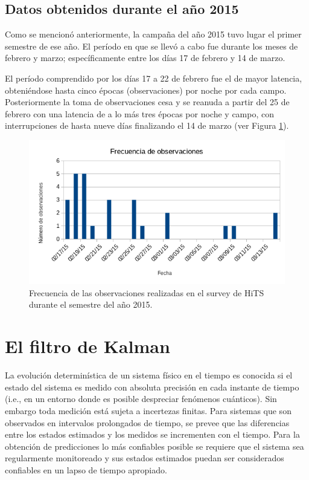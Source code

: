 \subsection{Datos obtenidos durante el a\~no 2015}\label{ssec:data}
Como se mencion\'o anteriormente, la campa\~na del a\~no 2015 tuvo lugar el primer semestre de ese a\~no. El per\'iodo en que se llev\'o a cabo fue durante los meses de febrero y marzo; espec\'ificamente entre los d\'ias 17 de febrero y 14 de marzo.
\bigskip

El per\'iodo comprendido por los d\'ias 17 a 22 de febrero fue el de mayor latencia, obteni\'endose hasta cinco \'epocas (observaciones) por noche por cada campo. Posteriormente la toma de observaciones cesa y se reanuda a partir del 25 de febrero con una latencia de a lo m\'as tres \'epocas por noche y campo, con interrupciones de hasta nueve d\'ias finalizando el 14 de marzo (ver Figura \ref{fig:cadencia}). 

\begin{figure}
\centering
\includegraphics[scale=1.0]{images/cadencia}
\caption{Frecuencia de las observaciones realizadas en el survey de HiTS durante el semestre del a\~no 2015.}
\label{fig:cadencia}
\end{figure}

\section{El filtro de Kalman}
La evoluci\'on determin\'istica de un sistema f\'isico en el tiempo es conocida si el estado del sistema es medido con absoluta precisi\'on en cada instante de tiempo (i.e., en un entorno donde es posible despreciar fen\'omenos cu\'anticos). Sin embargo toda medici\'on est\'a sujeta a incertezas finitas. Para sistemas que son observados en intervalos prolongados de tiempo, se prevee que las diferencias entre los estados estimados y los medidos se incrementen con el tiempo. Para la obtenci\'on de predicciones lo m\'as confiables posible se requiere que el sistema sea regularmente monitoreado y sus estados estimados puedan ser considerados confiables en un lapso de tiempo apropiado. 
\bigskip

